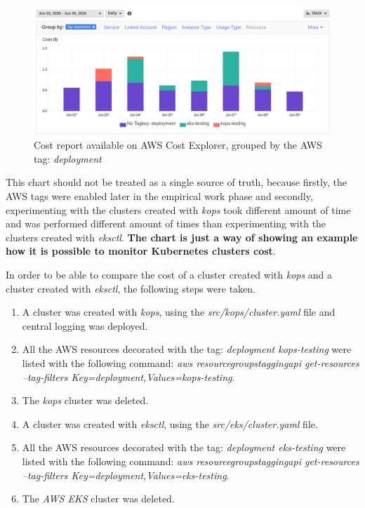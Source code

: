 \begin{figure}[H]
    \centering
    \includegraphics[width=15cm]{figures/aws-cost-explorer2.png}
    \captionsetup{justification=centering,margin=2cm,width=1.2\linewidth}
    \caption{Cost report available on AWS Cost Explorer, grouped by the AWS tag: \textit{deployment}}
    \label{aws-cost-explorer}
\end{figure}

This chart should not be treated as a single source of truth, because firstly, the AWS tags were enabled later in the empirical work phase and secondly, experimenting with the clusters created with \textit{kops} took different amount of time and was performed different amount of times than experimenting with the clusters created with \textit{eksctl}. \textbf{The chart is just a way of showing an example how it is possible to monitor Kubernetes clusters cost}.

In order to be able to compare the cost of a cluster created with \textit{kops} and a cluster created with \textit{eksctl}, the following steps were taken.
\begin{enumerate}
\item A cluster was created with \textit{kops}, using the \textit{src/kops/cluster.yaml} file and central logging was deployed.
\item All the AWS resources decorated with the tag: \textit{deployment kops-testing} were listed with the following command: \textit{aws resourcegroupstaggingapi get-resources --tag-filters Key=deployment,Values=kops-testing}.
\item The \textit{kops} cluster was deleted.
\item A cluster was created with \textit{eksctl}, using the \textit{src/eks/cluster.yaml} file.
\item All the AWS resources decorated with the tag: \textit{deployment eks-testing} were listed with the following command: \textit{aws resourcegroupstaggingapi get-resources --tag-filters Key=deployment,Values=eks-testing}.
\item The \textit{AWS EKS} cluster was deleted.
\end{enumerate}

